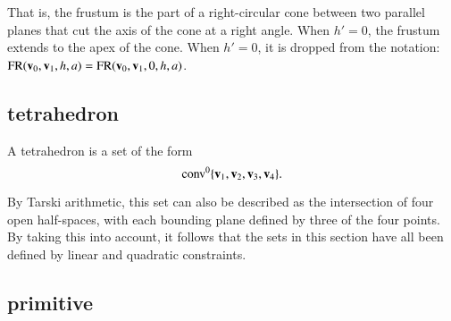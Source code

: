 That is, the frustum is the part of a right-circular cone between two
parallel planes that cut the axis of the cone at a right angle.  When
$h'=0$, the frustum extends to the apex of the cone.  When $h'=0$, it
is dropped from the notation:
${\operatorname{FR}}({\mathbf v}_0,{\mathbf v}_1,h,a)={\operatorname{FR}}({\mathbf v}_0,{\mathbf v}_1,0,h,a)$.

\subsection{tetrahedron}
%

\begin{definition}[tetrahedron] A tetrahedron is a set of the form
\begin{displaymath}{\operatorname{conv}}^0\{{\mathbf v}_1,{\mathbf v}_2,{\mathbf v}_3,{\mathbf v}_4\}.\end{displaymath}
%
\end{definition}

By Tarski arithmetic, %
this set can also be described
as the intersection of four open half-spaces, with each bounding
plane defined by three of the four points.
By taking this into account, it follows that
the sets in this section have all been defined by linear and quadratic
constraints.
%

\subsection{primitive}
%

